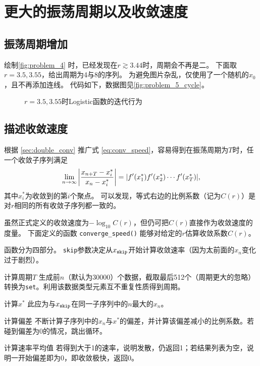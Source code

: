 \section{更大的振荡周期以及收敛速度}
\subsection{振荡周期增加}
绘制\autoref{fig:problem_4} 时，已经发现在$r\gtrsim 3.44$时，周期会不再是二。
下面取$r=3.5, 3.55$，给出周期为4与8的序列。
为避免图片杂乱，仅使用了一个随机的$x_0$，且不再添加连线。
代码如下，数据图见\autoref{fig:problem_5_cycle}。
{
    \linespread{1.0}
    
}

\begin{figure}
    \centering
    \caption{$r=3.5, 3.55$时Logistic函数的迭代行为}
    \label{fig:problem_5_cycle}
\end{figure}

\subsection{描述收敛速度}
根据 \autoref{sec:double_conv} 推广式 \eqref{eq:conv_speed}，容易得到在振荡周期为$T$时，任一个收敛子序列满足
\begin{equation}
    \lim_{n\to\infty} \qty|\frac{x_{n+T} - x_i^*}{x_{n} - x_i^*}| = \qty|f'(x_1^*)f'(x_2^*)\cdots f'(x_T^*)|,
\end{equation}
其中$x_i^*$为收敛到的第$i$个聚点。
可以发现，等式右边的比例系数（记为$C(r)$）是对$r$相同的所有收敛子序列都一致的。

虽然正式定义的收敛速度为$-\log_{10} C(r)$，但仍可把$C(r)$直接作为收敛速度的度量。
下面定义的函数 \verb|converge_speed()| 能够对给定的$r$估算收敛系数$C(r)$。
{
    \linespread{1.0}
    
}
函数分为四部分。
\texttt{skip}参数决定从$x_\text{\texttt{skip}}$开始计算收敛速率（因为太前面的$x_n$变化过于剧烈）。
\begin{compactitem}
    \item[计算周期$T$] 生成前$n$（默认为30000）个数据，截取最后512个（周期更大的忽略）转换为\texttt{set}。利用该数据类型元素互不重复性质得到周期。
    \item[计算$x^*$] 此应为与$x_\text{\texttt{skip}}$在同一子序列中的$n$最大的$x_n$。
    \item[计算偏差] 不断计算子序列中的$x_n$与$x^*$的偏差，并计算该偏差减小的比例系数。若碰到偏差为0的情况，跳出循环。
    \item[计算速率平均值] 若得到大于1的速率，说明发散，仍返回1；若结果列表为空，说明一开始偏差即为0，即收敛极快，返回0。
\end{compactitem}

